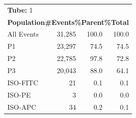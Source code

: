 \documentclass[UTF8,10pt,a4paper,fontset=fandol]{ctexart}
\newcommand{\fieldvalue}[1]{#1}
\begin{document}
\begin{center}
\small
\begin{tabular}{lrrr}
\multicolumn{4}{l}{\textbf{Tube:}%
\fieldvalue{1}}\\
\multicolumn{4}{l}{\textbf{Population}\hfill \textbf{\#Events}\hfill \textbf{\%Parent}\hfill \textbf{\%Total}}\\
All Events &
\fieldvalue{31,285} &
\fieldvalue{100.0} &
\fieldvalue{100.0}
\\
\quad P1 &
\fieldvalue{23,297} &
\fieldvalue{74.5} &
\fieldvalue{74.5}
\\
\quad\quad P2 &
\fieldvalue{22,785} &
\fieldvalue{97.8} &
\fieldvalue{72.8}
\\
\quad\quad\quad P3 &
\fieldvalue{20,043} &
\fieldvalue{88.0} &
\fieldvalue{64.1}
\\
\quad\quad\quad\quad ISO-FITC &
\fieldvalue{21} &
\fieldvalue{0.1} &
\fieldvalue{0.1}
\\
\quad\quad\quad\quad ISO-PE &
\fieldvalue{3} &
\fieldvalue{0.0} &
\fieldvalue{0.0}
\\
\quad\quad\quad\quad ISO-APC &
\fieldvalue{34} &
\fieldvalue{0.2} &
\fieldvalue{0.1}
\end{tabular}
\end{center}
\end{document}
